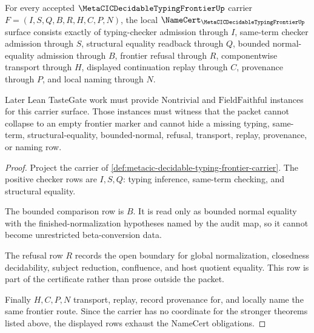 \begin{theorem}
\label{thm:metacic-decidable-typing-frontier-namecert-obligations}
For every accepted $\MetaCICDecidableTypingFrontierUp$ carrier $F=(I,S,Q,B,R,H,C,P,N)$, the local $\NameCert_{\MetaCICDecidableTypingFrontierUp}$ surface consists exactly of typing-checker admission through $I$, same-term checker admission through $S$, structural equality readback through $Q$, bounded normal-equality admission through $B$, frontier refusal through $R$, componentwise transport through $H$, displayed continuation replay through $C$, provenance through $P$, and local naming through $N$.

Later Lean TasteGate work must provide $\mathrm{Nontrivial}$ and $\mathrm{FieldFaithful}$ instances for this carrier surface. Those instances must witness that the packet cannot collapse to an empty frontier marker and cannot hide a missing typing, same-term, structural-equality, bounded-normal, refusal, transport, replay, provenance, or naming row.
\end{theorem}
\begin{proof}
Project the carrier of \autoref{def:metacic-decidable-typing-frontier-carrier}. The positive checker rows are $I,S,Q$: typing inference, same-term checking, and structural equality.

The bounded comparison row is $B$. It is read only as bounded normal equality with the finished-normalization hypotheses named by the audit map, so it cannot become unrestricted beta-conversion data.

The refusal row $R$ records the open boundary for global normalization, closedness decidability, subject reduction, confluence, and host quotient equality. This row is part of the certificate rather than prose outside the packet.

Finally $H,C,P,N$ transport, replay, record provenance for, and locally name the same frontier route. Since the carrier has no coordinate for the stronger theorems listed above, the displayed rows exhaust the NameCert obligations.
\end{proof}

